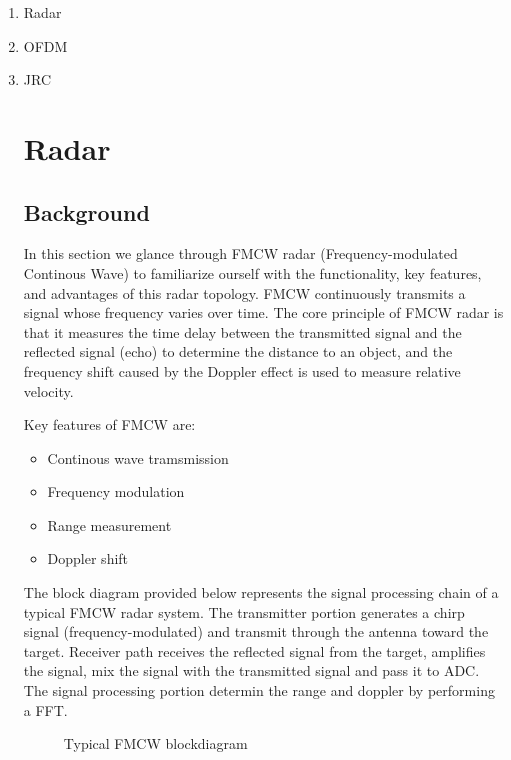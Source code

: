 \documentclass[conference]{IEEEtran}
\begin{document}
	\begin{enumerate}
	  \item Radar
        	  \item OFDM
         	 \item JRC\par
        
  \section {Radar}
   \subsection {Background}
   
In this section we glance through FMCW radar (Frequency-modulated Continous Wave) to familiarize ourself with the functionality, key features, and advantages of this radar topology. FMCW continuously transmits a signal whose frequency varies over time. The core principle of FMCW radar is that it measures the time delay between the transmitted signal and the reflected signal (echo) to determine the distance to an object, and the frequency shift caused by the Doppler effect is used to measure relative velocity.


Key features of FMCW are:
	\begin{itemize}
		\item Continous wave tramsmission
		\item Frequency modulation
		\item Range measurement
		\item Doppler shift
	\end {itemize}
	

 The block diagram provided below represents the signal processing chain of a typical FMCW radar system. The transmitter portion generates a chirp signal (frequency-modulated) and transmit through the antenna toward the target. Receiver path receives the reflected signal from the target, amplifies the signal, mix the signal with the transmitted signal and pass it to ADC. The signal processing portion determin the range and doppler by performing a FFT.

	\begin{figure}[H]
    		\centering
    		\caption{Typical FMCW blockdiagram \cite{9613183}}
	\end{figure}
	

\end{enumerate}
\end{document}
